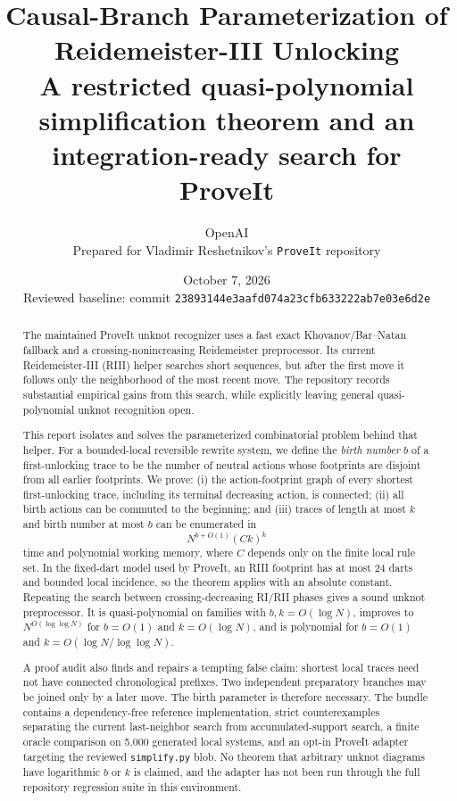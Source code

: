 \documentclass[11pt]{article}
\title{\textbf{Causal-Branch Parameterization of Reidemeister-III Unlocking}\\
\large A restricted quasi-polynomial simplification theorem and an integration-ready search for ProveIt}
\author{OpenAI\\Prepared for Vladimir Reshetnikov's \texttt{ProveIt} repository}
\date{October 7, 2026\\Reviewed baseline: commit \texttt{23893144e3aafd074a23cfb633222ab7e03e6d2e}}
\theoremstyle{definition}
\theoremstyle{remark}
\newcommand{\code}[1]{\texttt{#1}}
\begin{document}
\maketitle

\begin{abstract}
The maintained ProveIt unknot recognizer uses a fast exact Khovanov/Bar--Natan
fallback and a crossing-nonincreasing Reidemeister preprocessor.  Its current
Reidemeister-III (RIII) helper searches short sequences, but after the first
move it follows only the neighborhood of the most recent move.  The repository
records substantial empirical gains from this search, while explicitly leaving
general quasi-polynomial unknot recognition open.

This report isolates and solves the parameterized combinatorial problem behind
that helper.  For a bounded-local reversible rewrite system, we define the
\emph{birth number} $b$ of a first-unlocking trace to be the number of neutral
actions whose footprints are disjoint from all earlier footprints.  We prove:
(i) the action-footprint graph of every shortest first-unlocking trace, including
its terminal decreasing action, is connected; (ii) all birth actions can be
commuted to the beginning; and (iii) traces of length at most $k$ and birth
number at most $b$ can be enumerated in
\[
   N^{b+O(1)}(Ck)^k
\]
time and polynomial working memory, where $C$ depends only on the finite local
rule set.  In the fixed-dart model used by ProveIt, an RIII footprint has at most
24 darts and bounded local incidence, so the theorem applies with an absolute
constant.  Repeating the search between crossing-decreasing RI/RII phases gives
a sound unknot preprocessor.  It is quasi-polynomial on families with
$b,k=O(\log N)$, improves to $N^{O(\log\log N)}$ for $b=O(1)$ and
$k=O(\log N)$, and is polynomial for $b=O(1)$ and
$k=O(\log N/\log\log N)$.

A proof audit also finds and repairs a tempting false claim: shortest local
traces need not have connected chronological prefixes.  Two independent
preparatory branches may be joined only by a later move.  The birth parameter is
therefore necessary.  The bundle contains a dependency-free reference
implementation, strict counterexamples separating the current last-neighbor
search from accumulated-support search, a finite oracle comparison on 5,000
generated local systems, and an opt-in ProveIt adapter targeting the reviewed
\code{simplify.py} blob.  No theorem that arbitrary unknot diagrams have
logarithmic $b$ or $k$ is claimed, and the adapter has not been run through the
full repository regression suite in this environment.
\end{abstract}

\tableofcontents
\newpage













\end{document}
